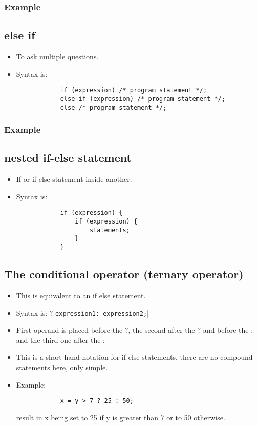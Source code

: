 \subsubsection{Example}

\subsection{else if}
\begin{itemize}
    \item To ask multiple questions. 
    \item Syntax is: 
        \begin{verbatim}
            if (expression) /* program statement */; 
            else if (expression) /* program statement */; 
            else /* program statement */; 
        \end{verbatim}
\end{itemize}
\subsubsection{Example}

\subsection{nested if-else statement}
\begin{itemize}
    \item If or if else statement inside another. 
    \item Syntax is: 
        \begin{verbatim}
            if (expression) {
                if (expression) {
                    statements;
                }
            }
        \end{verbatim}
\end{itemize}

\subsection{The conditional operator (ternary operator)}
\begin{itemize}
    \item This is equivalent to an if else statement. 
    \item Syntax is: ? \texttt{expression1: expression2;}|
    \item First operand is placed before the ?, the second after the ? and before the : and the third one after the : 
    \item This is a short hand notation for if else statements, there are no compound statements here, only simple. 
    \item Example: 
        \begin{verbatim}
            x = y > 7 ? 25 : 50; 
        \end{verbatim}
    result in x being set to 25 if y is greater than 7 or to 50 otherwise. 
\end{itemize}

